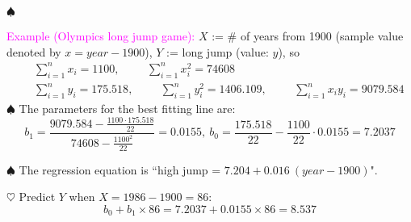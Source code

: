 \documentclass[20pt,landscape]{foils}
\newcommand{\no}{\noindent}
\begin{document}
{{{{{\foilhead[-.8in]{\textcolor{blue}{Example on regression}}
\no  $\spadesuit$ {\textcolor{magenta}{Example (Olympics long jump game):}  $X$ := \# of years from 1900 (sample value denoted by $x=year-1900$), $Y$ := long jump (value: $y$), so
 \begin{eqnarray*}
	&& \sum_{i=1}^{n} x_{i} = 1100, \hspace{1cm}
	\sum_{i=1}^{n}x_{i}^{2 } = 74608 \\
	&& \sum_{i=1}^{n} y_{i} = 175.518, \hspace{1cm}
	\sum_{i=1}^{n}y_{i}^{2} = 1406.109, \hspace{1cm}
	\sum_{i=1}^{n}x_{i}y_{i} = 9079.584
    \end{eqnarray*}
\no $\spadesuit$   The parameters for the best fitting line are:
  $$
	b_{1}= \frac{9079.584 - \frac{1100 \cdot 175.518}{22}}{74608 -
	\frac{1100^{2}}{22}} = 0.0155  , \
	b_{0} =\frac{175.518}{22} - \frac{1100}{22} \cdot 0.0155 = 7.2037
 $$

 \newpage
\no $\spadesuit$   The regression equation is
 ``high jump = $7.204 + 0.016\ (year-1900)$".

 \no$\heartsuit$ Predict $Y$ when $X=1986-1900=86$:
 \[ b_0 + b_1\times 86 = 7.2037 + 0.0155\times 86 = 8.537 \]

}}}}}}
\end{document}
